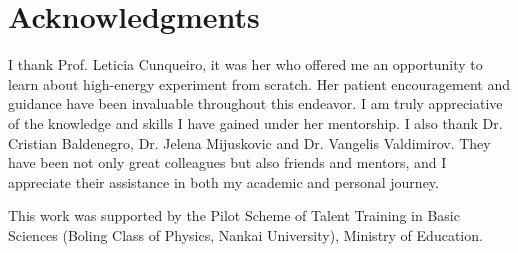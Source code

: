 \documentclass[a4paper, 12pt]{article}
\begin{document}
\section{Acknowledgments}
	I thank Prof. Leticia Cunqueiro, it was her who offered me an opportunity to learn about high-energy experiment from scratch.
	Her patient encouragement and guidance have been invaluable throughout this endeavor. I am truly appreciative of the
	knowledge and skills I have gained under her mentorship. I also thank Dr. Cristian Baldenegro, Dr. Jelena Mijuskovic and 
	Dr. Vangelis Valdimirov. They have been not only great colleagues but also friends and mentors, and I appreciate their assistance
	in both my academic and personal journey.\par
	This work was supported by the Pilot Scheme of Talent Training in Basic Sciences (Boling Class of Physics, Nankai University), Ministry of Education.



\end{document}
